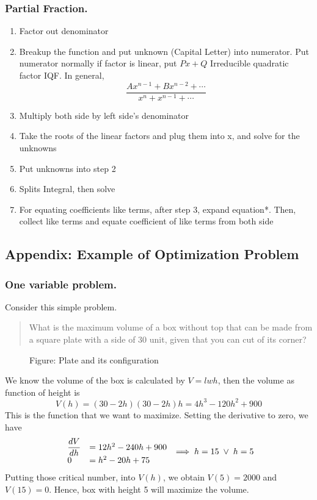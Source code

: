 \documentclass[../main.tex]{subfiles}
\begin{document}
\subsubsection{Partial Fraction. }
\begin{enumerate}
    \item Factor out denominator
    \item Breakup the function and put unknown (Capital Letter) into numerator. Put numerator normally if factor is linear, put $Px+Q$ Irreducible quadratic factor IQF. In general, \begin{equation*}
        \frac{Ax^{n-1}+Bx^{n-2}+\cdots}{x^{n}+x^{n-1}+\cdots}
    \end{equation*}
    \item Multiply both side by left side's denominator
    \item Take the roots of the linear factors and plug them into x, and solve for the unknowns
    \item Put unknowns into step 2
    \item Splits Integral, then solve
    \item For equating coefficients like terms, after step 3, expand equation*. Then, collect like terms and equate coefficient of like terms from both side
\end{enumerate}
\clearpage

\subsection{Appendix: Example of Optimization Problem}
\subsubsection{One variable problem.} Consider this simple problem.
\begin{quotation}
    What is the maximum volume of a box without top that can be made from a square plate with a side of 30 unit, given that you can cut of its corner?
\end{quotation}
\begin{figure*}[b]
    \centering
    \caption*{Figure: Plate and its configuration}
\end{figure*}

We know the volume of the box is calculated by $V=lwh$, then the volume as function of height is
\begin{equation*}
    V(h)=(30-2h)(30-2h)h=4h^3-120h^2+900
\end{equation*}
This is the function that we want to maximize. Setting the derivative to zero, we have 
\begin{equation*}
    \begin{array}{l l}
        \dfrac{dV}{dh}&=12h^2-240h+900\\
        0&=h^2-20h+75
    \end{array}\implies    
    h=15\;\lor\; h=5
\end{equation*}
Putting those critical number, into $V(h)$, we obtain $V(5)=2000$ and $V(15)=0$. Hence, box with height 5 will maximize the volume.
\end{document}
